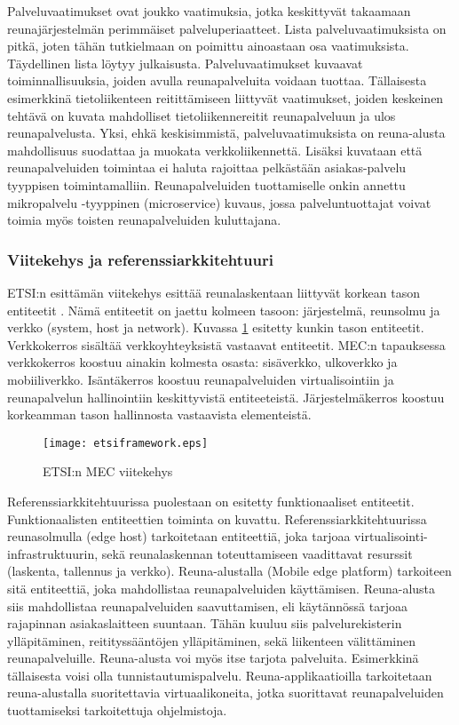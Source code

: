 Palveluvaatimukset ovat joukko vaatimuksia, jotka keskittyvät takaamaan reunajärjestelmän perimmäiset palveluperiaatteet.
Lista palveluvaatimuksista on pitkä, joten tähän tutkielmaan on poimittu ainoastaan osa vaatimuksista. Täydellinen lista löytyy \cite{etsitechreq} julkaisusta.
Palveluvaatimukset kuvaavat toiminnallisuuksia, joiden avulla reunapalveluita voidaan tuottaa. 
Tällaisesta esimerkkinä tietoliikenteen reitittämiseen liittyvät vaatimukset, joiden keskeinen tehtävä on kuvata mahdolliset tietoliikennereitit reunapalveluun ja ulos reunapalvelusta.
Yksi, ehkä keskisimmistä, palveluvaatimuksista on reuna-alusta mahdollisuus suodattaa ja muokata verkkoliikennettä. 
Lisäksi kuvataan että reunapalveluiden toimintaa ei haluta rajoittaa pelkästään asiakas-palvelu tyyppisen toimintamalliin. Reunapalveluiden tuottamiselle onkin annettu mikropalvelu -tyyppinen (microservice) kuvaus, jossa palveluntuottajat voivat toimia myös toisten reunapalveluiden kuluttajana.

\subsubsection{Viitekehys ja referenssiarkkitehtuuri}

ETSI:n esittämän viitekehys esittää reunalaskentaan liittyvät korkean tason entiteetit \cite{etsirefarch}. Nämä entiteetit on jaettu kolmeen tasoon: järjestelmä, reunsolmu ja verkko (system, host ja network).
Kuvassa \ref{fig:etsiframework} esitetty kunkin tason entiteetit.
Verkkokerros sisältää verkkoyhteyksistä vastaavat entiteetit. MEC:n tapauksessa verkkokerros koostuu ainakin kolmesta osasta: sisäverkko, ulkoverkko ja mobiiliverkko.
Isäntäkerros koostuu reunapalveluiden virtualisointiin ja reunapalvelun hallinointiin keskittyvistä entiteeteistä.
Järjestelmäkerros koostuu korkeamman tason hallinnosta vastaavista elementeistä.

\begin{figure}[tb]

\texttt{[image: etsiframework.eps]}
\caption{ETSI:n MEC viitekehys \cite{etsirefarch}} \label{fig:etsiframework}
\end{figure}

Referenssiarkkitehtuurissa puolestaan on esitetty funktionaaliset entiteetit. Funktionaalisten entiteettien toiminta on kuvattu.
Referenssiarkkitehtuurissa reunasolmulla (edge host) tarkoitetaan entiteettiä, joka tarjoaa virtualisointi-infrastruktuurin, sekä reunalaskennan toteuttamiseen vaadittavat resurssit (laskenta, tallennus ja verkko).
Reuna-alustalla (Mobile edge platform) tarkoiteen sitä entiteettiä, joka mahdollistaa reunapalveluiden käyttämisen. Reuna-alusta siis mahdollistaa reunapalveluiden saavuttamisen, eli käytännössä tarjoaa rajapinnan asiakaslaitteen suuntaan. Tähän kuuluu siis palvelurekisterin ylläpitäminen, reitityssääntöjen ylläpitäminen, sekä liikenteen välittäminen reunapalveluille. Reuna-alusta voi myös itse tarjota  palveluita.
Esimerkkinä tällaisesta voisi olla tunnistautumispalvelu. 
Reuna-applikaatioilla tarkoitetaan reuna-alustalla suoritettavia virtuaalikoneita, jotka suorittavat reunapalveluiden tuottamiseksi tarkoitettuja ohjelmistoja.

